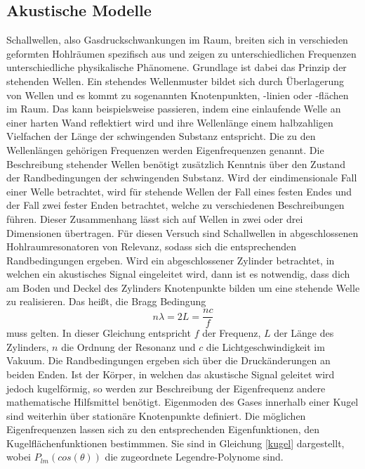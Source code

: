 \subsection{Akustische Modelle}
Schallwellen, also Gasdruckschwankungen im Raum, breiten sich in verschieden geformten 
Hohlräumen spezifisch aus und zeigen zu unterschiedlichen Frequenzen unterschiedliche 
physikalische Phänomene. Grundlage ist dabei das Prinzip der stehenden Wellen.
Ein stehendes Wellenmuster bildet sich durch Überlagerung von Wellen und es kommt zu 
sogenannten Knotenpunkten, -linien oder -flächen im Raum. Das kann beispielsweise 
passieren, indem eine einlaufende Welle an einer harten Wand reflektiert wird und ihre 
Wellenlänge einem halbzahligen Vielfachen der Länge der schwingenden Substanz entspricht.
Die zu den Wellenlängen gehörigen Frequenzen werden Eigenfrequenzen genannt.
Die Beschreibung stehender Wellen benötigt zusätzlich Kenntnis über den Zustand der 
Randbedingungen der schwingenden Substanz.
Wird der eindimensionale Fall einer Welle betrachtet, wird für stehende Wellen der Fall 
eines festen Endes und der Fall zwei fester Enden betrachtet, welche zu verschiedenen 
Beschreibungen führen. Dieser Zusammenhang lässt 
sich auf Wellen in zwei oder drei Dimensionen übertragen. Für diesen Versuch sind 
Schallwellen in abgeschlossenen Hohlraumresonatoren von Relevanz, sodass
sich die entsprechenden Randbedingungen ergeben.
Wird ein abgeschlossener Zylinder betrachtet, in welchen ein akustisches Signal 
eingeleitet wird, dann ist es notwendig, dass dich am Boden und Deckel des Zylinders 
Knotenpunkte bilden um eine stehende Welle zu realisieren. Das heißt, die 
Bragg Bedingung 
\begin{equation}
    n\lambda = 2 L = \frac{nc}{f}
    \label{bragg}
\end{equation}
muss gelten. In dieser Gleichung entspricht $f$ der Frequenz, $L$ der Länge des 
Zylinders, $n$ die Ordnung der Resonanz und $c$ die Lichtgeschwindigkeit im Vakuum.
Die Randbedingungen ergeben 
sich über die Druckänderungen an beiden Enden.
Ist der Körper, in welchen das akustische Signal geleitet wird jedoch kugelförmig, so 
werden zur Beschreibung der Eigenfrequenz andere mathematische Hilfsmittel benötigt.
Eigenmoden des Gases innerhalb einer Kugel sind weiterhin über stationäre Knotenpunkte 
definiert. Die möglichen Eigenfrequenzen lassen sich zu den entsprechenden 
Eigenfunktionen, den Kugelflächenfunktionen bestimmmen. Sie sind in Gleichung \ref{kugel}
dargestellt, wobei $P_{lm}(cos(\theta))$ die zugeordnete Legendre-Polynome sind. 

